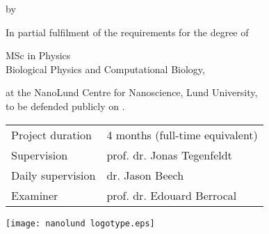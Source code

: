 {
\pagestyle{empty}



\clearpage

\begin{titlepage}
	
	\frutigerfont
	
	\begin{center}

		
		{\Huge \garamondfont \thetitle}
		
		\smallskip
		by
		\bigskip
		
		{\Large \garamondfont \theauthor}
		
		\bigskip
		
		In partial fulfilment of the requirements for the degree of 
		
		\bigskip
		
		{MSc in Physics} \\
		Biological Physics and Computational Biology,
		
		\bigskip
		
		at the NanoLund Centre for Nanoscience, Lund University,\\
		to be defended publicly on .
		
		
		\vspace{5cm}
		
		\vfill
		\begin{tabular}{ll}
			Project duration & 4 months (full-time equivalent)\\
			Supervision & prof. dr. Jonas Tegenfeldt\\
			Daily supervision & dr. Jason Beech\\
			Examiner & prof. dr. Edouard Berrocal
		\end{tabular}
	
		\vspace{3cm}
		
		\texttt{[image: nanolund logotype.eps]}
	
	
	\end{center}
\end{titlepage}
}